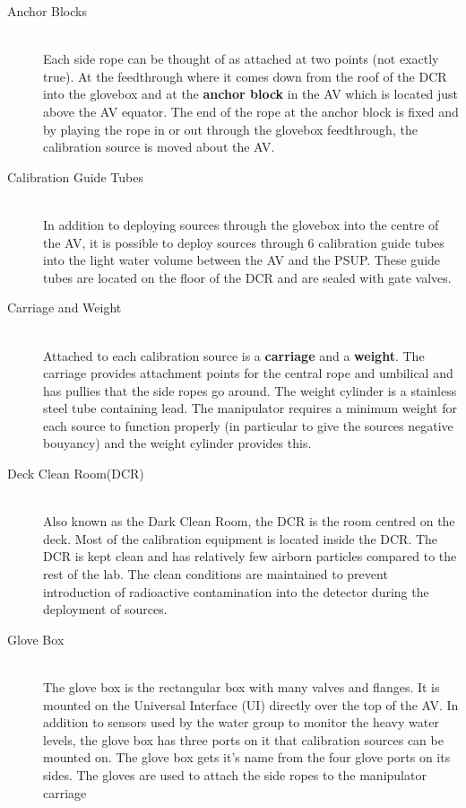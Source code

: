 \begin{description}
\item[Anchor Blocks]~\\
  Each side rope can be thought of as attached at two points (not exactly 
  true).  At the feedthrough where it comes down from the roof of the DCR
  into the glovebox and at the {\bf anchor block} in the AV which is located
  just above the AV equator.  The end of the rope at the anchor block is fixed
  and by playing the rope in or out through the glovebox feedthrough, the 
  calibration source is moved about the AV.
\item[Calibration Guide Tubes]~\\
  In addition to deploying sources through the glovebox into the centre of the
  AV, it is possible to deploy sources through 6 calibration guide tubes into 
  the light water volume between the AV and the PSUP.  These guide tubes are 
  located on the floor of the DCR and are sealed with gate valves.
\item[Carriage and Weight]~\\
  Attached to each calibration source is a {\bf carriage} and a {\bf weight}.  
  The carriage provides attachment points for the central rope and umbilical 
  and has pullies that the side ropes go around.  The weight cylinder is a 
  stainless steel tube containing lead.  The manipulator requires a minimum 
  weight for each source to function properly  (in particular to give the 
  sources negative bouyancy) and the weight cylinder provides this.
\item[Deck Clean Room(DCR)]~\\
  Also known as the Dark Clean Room, the DCR is the room centred on the deck.
  Most of the calibration equipment is located inside the DCR.  The DCR is
  kept clean and has relatively few airborn particles compared to the rest of
  the lab.  The clean conditions are maintained to prevent introduction of 
  radioactive
  contamination into the detector during the deployment of sources.
\item[Glove Box]~\\
  The glove box is the rectangular box with many valves and flanges.  It is 
  mounted on the Universal Interface (UI) directly over the top of the AV.  In 
  addition to sensors used by the water group to monitor the heavy water 
  levels, the glove box
  has three ports on it that calibration sources can be mounted on.  The 
  glove box gets it's name from the four glove ports on its sides.  The 
  gloves are used to attach the side ropes to the manipulator carriage 

\end{description}
